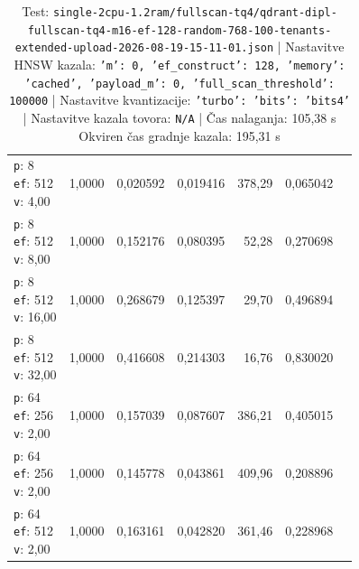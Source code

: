\begin{table}[htbp]
\begin{tabularx}{\textwidth}{Xrrrrrr}
    \makecell{\texttt{p}: 8\\\texttt{ef}: 512\\\texttt{v}: 4,00} & 1,0000 & 0,020592 & 0,019416 & 378,29 & 0,065042 \\
    \makecell{\texttt{p}: 8\\\texttt{ef}: 512\\\texttt{v}: 8,00} & 1,0000 & 0,152176 & 0,080395 & 52,28 & 0,270698 \\
    \makecell{\texttt{p}: 8\\\texttt{ef}: 512\\\texttt{v}: 16,00} & 1,0000 & 0,268679 & 0,125397 & 29,70 & 0,496894 \\
    \makecell{\texttt{p}: 8\\\texttt{ef}: 512\\\texttt{v}: 32,00} & 1,0000 & 0,416608 & 0,214303 & 16,76 & 0,830020 \\
    \makecell{\texttt{p}: 64\\\texttt{ef}: 256\\\texttt{v}: 2,00} & 1,0000 & 0,157039 & 0,087607 & 386,21 & 0,405015 \\
    \makecell{\texttt{p}: 64\\\texttt{ef}: 256\\\texttt{v}: 2,00} & 1,0000 & 0,145778 & 0,043861 & 409,96 & 0,208896 \\
    \makecell{\texttt{p}: 64\\\texttt{ef}: 512\\\texttt{v}: 2,00} & 1,0000 & 0,163161 & 0,042820 & 361,46 & 0,228968 \\
    \bottomrule
  \end{tabularx}
\caption* {Test: \texttt{single-2cpu-1.2ram/fullscan-tq4/qdrant-dipl-fullscan-tq4-m16-ef-128-random-768-100-tenants-extended-upload-2026-08-19-15-11-01.json} | Nastavitve HNSW kazala: \texttt{{'m': 0, 'ef\_construct': 128, 'memory': 'cached', 'payload\_m': 0, 'full\_scan\_threshold': 100000}} | Nastavitve kvantizacije: \texttt{{'turbo': {'bits': 'bits4'}}} | Nastavitve kazala tovora: \texttt{N/A} | Čas nalaganja: 105,38 s Okviren čas gradnje kazala: 195,31 s}\end{table}


